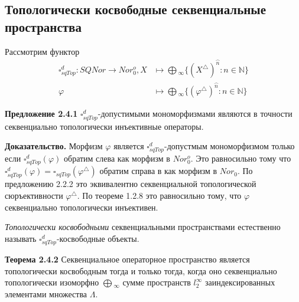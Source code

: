 \documentclass[12pt]{article}
\begin{document}
\subsection{Топологически косвободные секвенциальные пространства}

Рассмотрим функтор 
$$
\begin{aligned}
\square_{sqTop}^d 
: SQNor \to Nor_0^o, X &\mapsto \bigoplus{}_\infty  \{
    {(X^{\triangle })}^{\wideparen{n}} 
    : n \in \mathbb{N}
 \} \\
\varphi&\mapsto\bigoplus{}_\infty  \{
    {(\varphi^\triangle )}^{\wideparen{n}} : n \in \mathbb{N}
 \}
\end{aligned}
$$

{\bf Предложение 2.4.1} $\square_{sqTop}^d$-допустимыми мономорфизмами являются
в точности секвенциально топологически инъективные операторы.

{\bf Доказательство.}  Морфизм $\varphi$ является $\square_{sqTop}^d$-допустмым
мономорфизмом только если $\square_{sqTop}^d(\varphi)$ обратим слева как морфизм
в $Nor_0^o$. Это равносильно тому что
$\square_{sqTop}^d(\varphi)=\square_{sqTop}(\varphi^\triangle)$ обратим справа в
как морфизм в $Nor_0$. По предложению 2.2.2 это эквивалентно секвенциальной
топологической сюръективности $\varphi^\triangle$. По теореме 1.2.8 это
равносильно тому, что $\varphi$ секвенциально топологически инъективен.

\medskip

\textit{Топологически косвободными} секвенциальными пространствами естественно
называть $\square_{sqTop}^d$-косвободные объекты.

\medskip
 
{\bf Теорема 2.4.2} Секвенциальное операторное пространство является
топологически косвободным тогда и только тогда, когда оно секвенциально
топологически изоморфно $\bigoplus{}_\infty$ сумме пространств $l_2^\infty$
заиндексированных элементами множества $\Lambda$.
\end{document}
